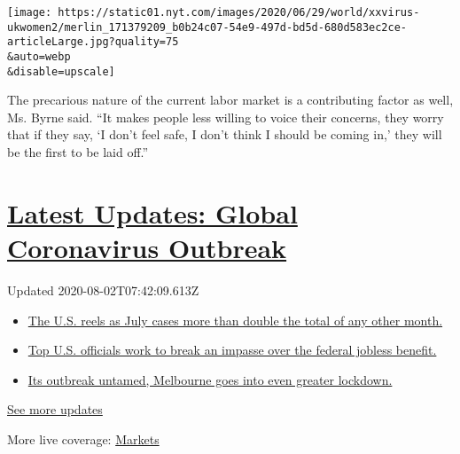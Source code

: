 \texttt{[image: https://static01.nyt.com/images/2020/06/29/world/xxvirus-ukwomen2/merlin\_171379209\_b0b24c07-54e9-497d-bd5d-680d583ec2ce-articleLarge.jpg?quality=75\\\&auto=webp\\\&disable=upscale]}

The precarious nature of the current labor market is a contributing
factor as well, Ms. Byrne said. ``It makes people less willing to voice
their concerns, they worry that if they say, `I don't feel safe, I don't
think I should be coming in,' they will be the first to be laid off.''

\hypertarget{latest-updates-global-coronavirus-outbreak}{%
\section{\texorpdfstring{\href{https://www.nytimes.com/2020/08/01/world/coronavirus-covid-19.html?action=click\&pgtype=Article\&state=default\&region=MAIN_CONTENT_1\&context=storylines_live_updates}{Latest
Updates: Global Coronavirus
Outbreak}}{Latest Updates: Global Coronavirus Outbreak}}\label{latest-updates-global-coronavirus-outbreak}}

Updated 2020-08-02T07:42:09.613Z

\begin{itemize}
\tightlist
\item
  \href{https://www.nytimes.com/2020/08/01/world/coronavirus-covid-19.html?action=click\&pgtype=Article\&state=default\&region=MAIN_CONTENT_1\&context=storylines_live_updates\#link-34047410}{The
  U.S. reels as July cases more than double the total of any other
  month.}
\item
  \href{https://www.nytimes.com/2020/08/01/world/coronavirus-covid-19.html?action=click\&pgtype=Article\&state=default\&region=MAIN_CONTENT_1\&context=storylines_live_updates\#link-780ec966}{Top
  U.S. officials work to break an impasse over the federal jobless
  benefit.}
\item
  \href{https://www.nytimes.com/2020/08/01/world/coronavirus-covid-19.html?action=click\&pgtype=Article\&state=default\&region=MAIN_CONTENT_1\&context=storylines_live_updates\#link-2bc8948}{Its
  outbreak untamed, Melbourne goes into even greater lockdown.}
\end{itemize}

\href{https://www.nytimes.com/2020/08/01/world/coronavirus-covid-19.html?action=click\&pgtype=Article\&state=default\&region=MAIN_CONTENT_1\&context=storylines_live_updates}{See
more updates}

More live coverage:
\href{https://www.nytimes.com/live/2020/07/31/business/stock-market-today-coronavirus?action=click\&pgtype=Article\&state=default\&region=MAIN_CONTENT_1\&context=storylines_live_updates}{Markets}

